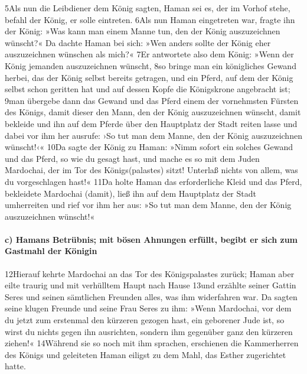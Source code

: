 5Als nun die Leibdiener dem König sagten, Haman sei es, der im Vorhof
stehe, befahl der König, er solle eintreten. 6Als nun Haman eingetreten
war, fragte ihn der König: »Was kann man einem Manne tun, den der König
auszuzeichnen wünscht?« Da dachte Haman bei sich: »Wen anders sollte der
König eher auszuzeichnen wünschen als mich?« 7Er antwortete also dem
König: »Wenn der König jemanden auszuzeichnen wünscht, 8so bringe man
ein königliches Gewand herbei, das der König selbst bereits getragen,
und ein Pferd, auf dem der König selbst schon geritten hat und auf
dessen Kopfe die Königskrone angebracht ist; 9man übergebe dann das
Gewand und das Pferd einem der vornehmsten Fürsten des Königs, damit
dieser den Mann, den der König auszuzeichnen wünscht, damit bekleide und
ihn auf dem Pferde über den Hauptplatz der Stadt reiten lasse und dabei
vor ihm her ausrufe: ›So tut man dem Manne, den der König auszuzeichnen
wünscht!‹« 10Da sagte der König zu Haman: »Nimm sofort ein solches
Gewand und das Pferd, so wie du gesagt hast, und mache es so mit dem
Juden Mardochai, der im Tor des Königs(palastes) sitzt! Unterlaß nichts
von allem, was du vorgeschlagen hast!« 11Da holte Haman das
erforderliche Kleid und das Pferd, bekleidete Mardochai (damit), ließ
ihn auf dem Hauptplatz der Stadt umherreiten und rief vor ihm her aus:
»So tut man dem Manne, den der König auszuzeichnen wünscht!«

\hypertarget{c-hamans-betruxfcbnis-mit-buxf6sen-ahnungen-erfuxfcllt-begibt-er-sich-zum-gastmahl-der-kuxf6nigin}{%
\paragraph{c) Hamans Betrübnis; mit bösen Ahnungen erfüllt, begibt er
sich zum Gastmahl der
Königin}\label{c-hamans-betruxfcbnis-mit-buxf6sen-ahnungen-erfuxfcllt-begibt-er-sich-zum-gastmahl-der-kuxf6nigin}}

12Hierauf kehrte Mardochai an das Tor des Königspalastes zurück; Haman
aber eilte traurig und mit verhülltem Haupt nach Hause 13und erzählte
seiner Gattin Seres und seinen sämtlichen Freunden alles, was ihm
widerfahren war. Da sagten seine klugen Freunde und seine Frau Seres zu
ihm: »Wenn Mardochai, vor dem du jetzt zum erstenmal den kürzeren
gezogen hast, ein geborener Jude ist, so wirst du nichts gegen ihn
ausrichten, sondern ihm gegenüber ganz den kürzeren ziehen!« 14Während
sie so noch mit ihm sprachen, erschienen die Kammerherren des Königs und
geleiteten Haman eiligst zu dem Mahl, das Esther zugerichtet hatte.

